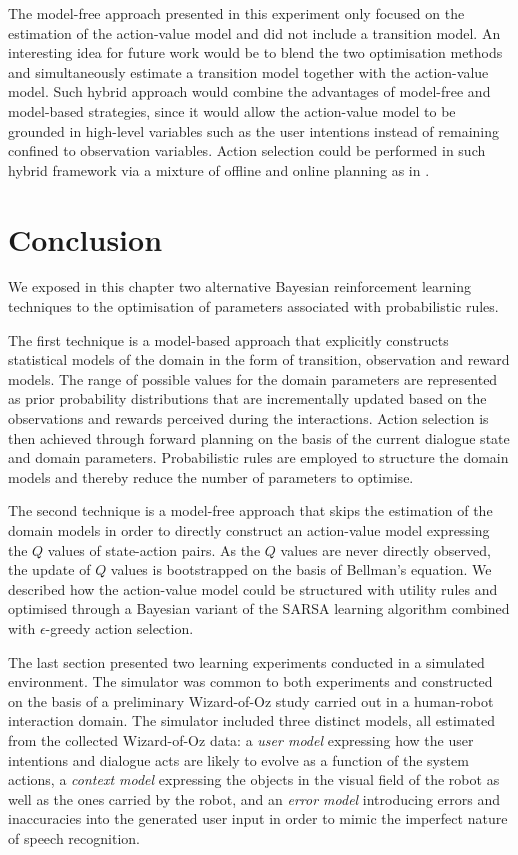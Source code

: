 The model-free approach presented in this experiment only focused on the estimation of the action-value model and did not include a transition model.  An interesting idea for future work would be to blend the two optimisation methods and simultaneously estimate a transition model together with the action-value model.  Such hybrid approach would combine the advantages of model-free and model-based strategies, since it would allow the action-value model to be grounded in high-level variables such as the user intentions instead of remaining confined to observation variables. Action selection could be performed in such hybrid framework via a mixture of offline and online planning as in \cite{RossC07}. 

\section{Conclusion}


We exposed in this chapter two alternative Bayesian reinforcement learning techniques to the optimisation of parameters associated with probabilistic rules.

The first technique is a model-based approach that explicitly constructs statistical models of the domain in the form of transition, observation and reward models.  The range of possible values for the domain parameters are represented as prior probability distributions that are incrementally updated based on the observations and rewards perceived during the interactions. Action selection is then achieved through forward planning on the basis of the current dialogue state and domain parameters. Probabilistic rules are employed to structure the domain models and thereby reduce the number of parameters to optimise. 

The second technique is a model-free approach that skips the estimation of the domain models in order to directly construct an action-value model expressing the $Q$ values of state-action pairs.  As the $Q$ values are never directly observed, the update of $Q$ values is bootstrapped on the basis of Bellman's equation. We described how the action-value model could be structured with utility rules and optimised through a Bayesian variant of the SARSA learning algorithm combined with $\epsilon$-greedy action selection. 

The last section presented two learning experiments conducted in a simulated environment.  The simulator was common to both experiments and constructed on the basis of a preliminary Wizard-of-Oz study carried out in a human-robot interaction domain. The simulator included three distinct models, all estimated from the collected Wizard-of-Oz data: a \textit{user model} expressing how the user intentions and dialogue acts are likely to evolve as a function of the system actions, a \textit{context model} expressing the objects in the visual field of the robot as well as the ones carried by the robot, and an \textit{error model} introducing errors and inaccuracies into the generated user input in order to mimic the imperfect nature of speech recognition.


